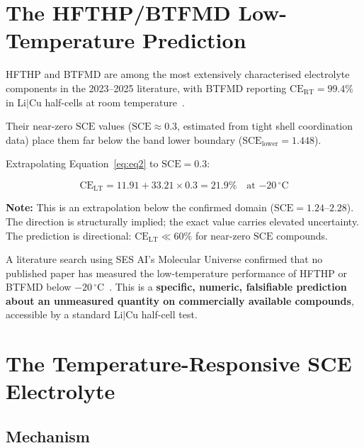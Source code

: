 \documentclass[12pt,letterpaper]{article}
\newcommand{\mSCE}{\mathrm{SCE}}
\newcommand{\mCELT}{\mathrm{CE}_{\mathrm{LT}}}
\begin{document}
\section{The HFTHP/BTFMD Low-Temperature Prediction}
\label{sec:ltprediction}

HFTHP and BTFMD are among the most extensively
characterised electrolyte components in the 2023--2025
literature, with BTFMD reporting
$\mathrm{CE}_{\mathrm{RT}} = 99.4\%$ in
Li$|$Cu half-cells at room
temperature~\cite{lee2024btfmd}.

Their near-zero $\mSCE$ values ($\mSCE \approx 0.3$,
estimated from tight shell coordination data) place them
far below the band lower boundary
($\mSCE_{\mathrm{lower}} = 1.448$).

Extrapolating Equation~\ref{eq:eq2} to $\mSCE = 0.3$:

\begin{equation}
  \mCELT = 11.91 + 33.21 \times 0.3 = 21.9\%
  \quad \text{at } {-20\,^{\circ}\mathrm{C}}
  \label{eq:hfthp}
\end{equation}

\noindent\textbf{Note:} This is an extrapolation below
the confirmed domain ($\mSCE = 1.24$--$2.28$).
The direction is structurally implied; the exact value
carries elevated uncertainty.
The prediction is directional:
$\mCELT \ll 60\%$ for near-zero $\mSCE$ compounds.

A literature search using SES AI's Molecular Universe
confirmed that no published paper has measured the
low-temperature performance of HFTHP or BTFMD
below $-20\,^{\circ}\mathrm{C}$~\cite{mu2026query6}.
This is a \textbf{specific, numeric, falsifiable
prediction about an unmeasured quantity on commercially
available compounds}, accessible by a standard Li$|$Cu
half-cell test.

\section{The Temperature-Responsive SCE Electrolyte}
\label{sec:tempresponsive}

\subsection{Mechanism}
\label{sec:mechanism}
\end{document}
